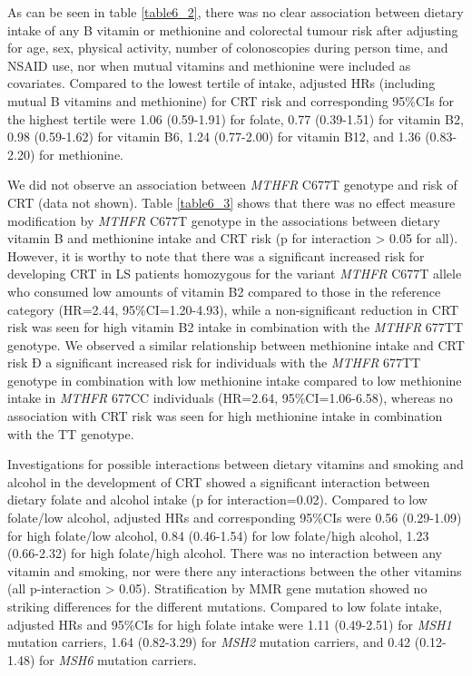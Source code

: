 \noindent As can be seen in table \ref{table6_2}, there was no clear association between dietary intake of any B vitamin or methionine and colorectal tumour risk after adjusting for age, sex, physical activity, number of colonoscopies during person time, and NSAID use, nor when mutual vitamins and methionine were included as covariates. Compared to the lowest tertile of intake, adjusted HRs (including mutual B vitamins and methionine) for CRT risk and corresponding 95\%CIs for the highest tertile were 1.06 (0.59-1.91) for folate, 0.77 (0.39-1.51) for vitamin B2, 0.98 (0.59-1.62) for vitamin B6, 1.24 (0.77-2.00) for vitamin B12, and 1.36 (0.83-2.20) for methionine.

\noindent We did not observe an association between \emph{MTHFR} C677T genotype and risk of CRT (data not shown). Table \ref{table6_3} shows that there was no effect measure modification by \emph{MTHFR} C677T genotype in the associations between dietary vitamin B and methionine intake and CRT risk (p for interaction > 0.05 for all). However, it is worthy to note that there was a significant increased risk for developing CRT in LS patients homozygous for the variant \emph{MTHFR} C677T allele who consumed low amounts of vitamin B2 compared to those in the reference category (HR=2.44, 95\%CI=1.20-4.93), while a non-significant reduction in CRT risk was seen for high vitamin B2 intake in combination with the \emph{MTHFR} 677TT genotype. We observed a similar relationship between methionine intake and CRT risk Ð a significant increased risk for individuals with the \emph{MTHFR} 677TT genotype in combination with low methionine intake compared to low methionine intake in \emph{MTHFR} 677CC individuals (HR=2.64, 95\%CI=1.06-6.58), whereas no association with CRT risk was seen for high methionine intake in combination with the TT genotype.

\noindent Investigations for possible interactions between dietary vitamins and smoking and alcohol in the development of CRT showed a significant interaction between dietary folate and alcohol intake (p for interaction=0.02). Compared to low folate/low alcohol, adjusted HRs and corresponding 95\%CIs were 0.56 (0.29-1.09) for high folate/low alcohol, 0.84 (0.46-1.54) for low folate/high alcohol, 1.23 (0.66-2.32) for high folate/high alcohol. There was no interaction between any vitamin and smoking, nor were there any interactions between the other vitamins (all p-interaction > 0.05). Stratification by MMR gene mutation showed no striking differences for the different mutations. Compared to low folate intake, adjusted HRs and 95\%CIs for high folate intake were 1.11 (0.49-2.51) for \emph{MSH1} mutation carriers, 1.64 (0.82-3.29) for \emph{MSH2} mutation carriers, and 0.42 (0.12-1.48) for \emph{MSH6} mutation carriers.

